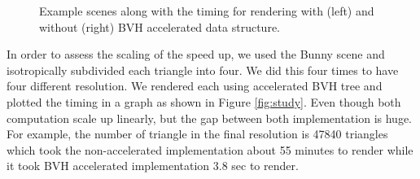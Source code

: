\documentclass[12pt] {article}
\begin{document}
\begin{figure}[!tbh]
 \centering        
   \caption{Example scenes along with the timing for rendering with (left) and without (right) BVH accelerated data structure.}
   \label{fig:bvh}
\end{figure} 

In order to assess the scaling of the speed up, we used the Bunny scene and isotropically subdivided each triangle into four. We did this four times to have four different resolution. We rendered each using accelerated BVH tree and plotted the timing in a graph as shown in Figure \ref{fig:study}. Even though both computation scale up linearly, but the gap between both implementation is huge. For example, the number of triangle in the final resolution is 47840 triangles which took the non-accelerated implementation about 55 minutes to render while it took BVH accelerated implementation 3.8 sec to render. 
\end{document}
